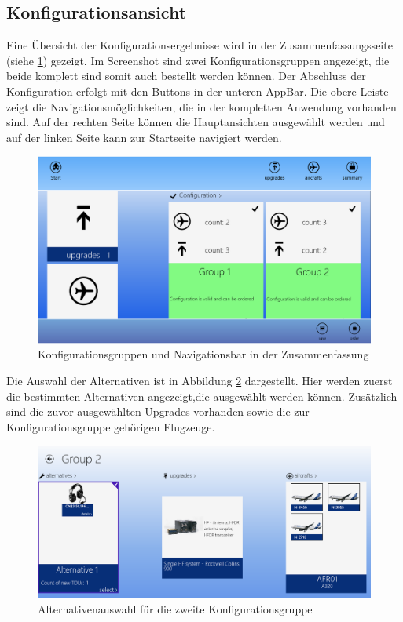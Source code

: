\subsection{Konfigurationsansicht}
Eine Übersicht der Konfigurationsergebnisse wird in der Zusammenfassungsseite (siehe \ref{configurationResultImpl}) gezeigt. Im Screenshot sind zwei Konfigurationsgruppen angezeigt, die beide komplett sind somit auch bestellt werden können. Der Abschluss der Konfiguration erfolgt mit den Buttons in der unteren AppBar. Die obere Leiste zeigt die Navigationsmöglichkeiten, die in der kompletten Anwendung vorhanden sind. Auf der rechten Seite können die Hauptansichten ausgewählt werden und auf der linken Seite kann zur Startseite navigiert werden. 
\begin{figure}[H]
\centering
\includegraphics[width=\hsize]{images/impl/app_bar_impl}
\caption{Konfigurationsgruppen und Navigationsbar in der Zusammenfassung}
\label{configurationResultImpl}
\end{figure}
Die Auswahl der Alternativen ist in Abbildung \ref{alternativeSelectionImpl} dargestellt. Hier werden zuerst die bestimmten Alternativen angezeigt,die ausgewählt werden können. Zusätzlich sind die zuvor ausgewählten Upgrades vorhanden sowie die zur Konfigurationsgruppe gehörigen Flugzeuge. 
\begin{figure}[H]
\centering
\includegraphics[width=\hsize]{images/impl/alternative_impl}
\caption{Alternativenauswahl für die zweite Konfigurationsgruppe}
\label{alternativeSelectionImpl}
\end{figure}

 